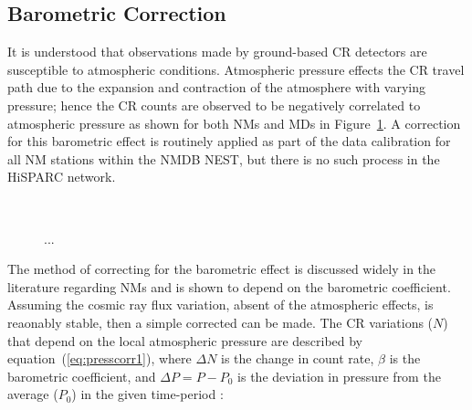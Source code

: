 \subsection{Barometric Correction}\label{sec:HS_P_corr}

It is understood that observations made by ground-based CR detectors are susceptible to atmospheric conditions. Atmospheric pressure effects the CR travel path due to the expansion and contraction of the atmosphere with varying pressure; hence the CR counts are observed to be negatively correlated to atmospheric pressure as shown for both NMs and MDs in Figure~\ref{fig:CR_V_P}. A correction for this barometric effect is routinely applied as part of the data calibration for all NM stations within the NMDB NEST, but there is no such process in the HiSPARC network.


\begin{figure}[ht]
	\centering
	 \\
	
	\caption{...}
	\label{fig:CR_V_P}
\end{figure}


The method of correcting for the barometric effect is discussed widely in the literature regarding NMs and is shown to depend on the barometric coefficient. Assuming the cosmic ray flux variation, absent of the atmospheric effects, is reaonably stable, then a simple corrected can be made. The CR variations ($N$) that depend on the local atmospheric pressure are described by equation~(\ref{eq:presscorr1}), where $\Delta N$ is the change in count rate, $\beta$ is the barometric coefficient, and $\Delta P = P - P_0$ is the deviation in pressure from the average ($P_0$) in the given time-period \citep{paschalis_online_2013}:

